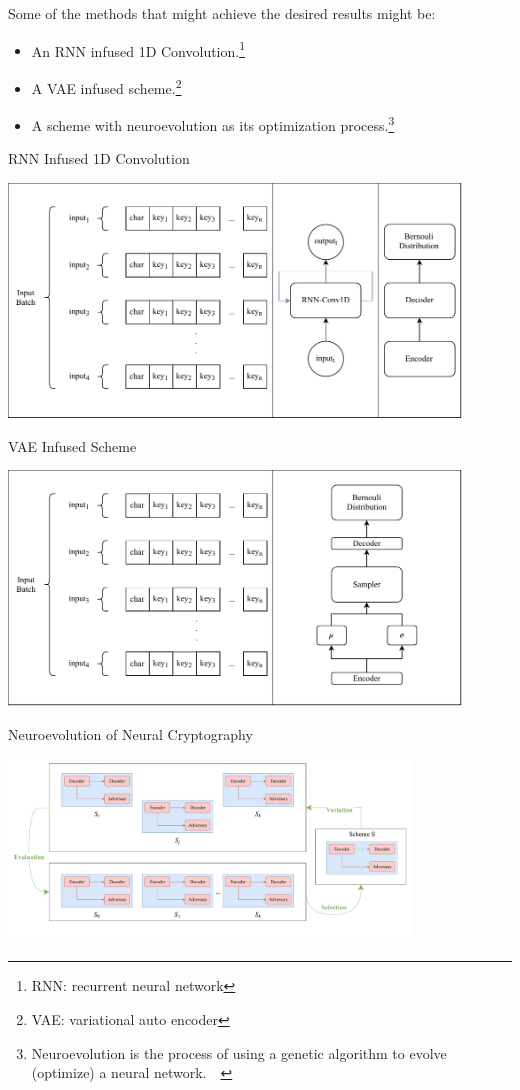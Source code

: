 \documentclass[a4paper, 12pt]{report}
\begin{document}
Some of the methods that might achieve the desired results might be:
\begin{itemize}
	\item An RNN infused 1D Convolution.\footnote{RNN: recurrent neural network}
	\item A VAE infused scheme.\footnote{VAE: variational auto encoder}
	\item A scheme with neuroevolution as its optimization process.\footnote{Neuroevolution is the process of using a genetic algorithm to evolve (optimize) a neural network.~\citep{Floreano2008}~\citep{DBLP:journals/corr/abs-1803-00657}}
\end{itemize}
\newpage
\begin{blockfigure}{RNN Infused 1D Convolution}
	\begin{center}
		\includegraphics[width = 0.9\textwidth]{suggestion_rnn_conv1d}
	\end{center}
\end{blockfigure}
\begin{blockfigure}{VAE Infused Scheme}
	\begin{center}
		\includegraphics[width = 0.9\textwidth]{suggestion_vae}
	\end{center}
\end{blockfigure}
\begin{blockfigure}{Neuroevolution of Neural Cryptography}
	\begin{center}
		\includegraphics[width = 0.8\textwidth]{GAC}
	\end{center}
\end{blockfigure}
\newpage
\end{document}
